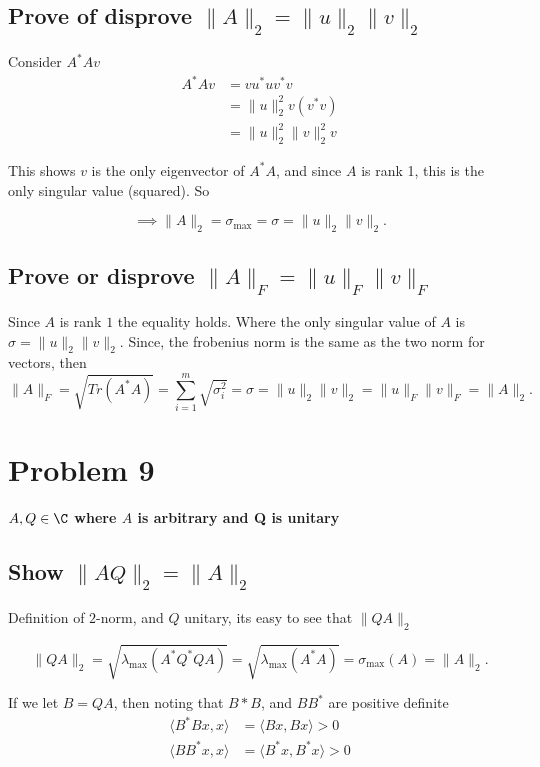 \subsection{Prove of disprove $\|A\|_{2} = \|u\|_{2}\|v\|_{2}$}%
\label{sub:prove_of_disprove_|a|__2_|u|__2_$}

Consider $A^{*}Av$ 
\begin{align*}
  A^*Av&=vu^*uv^*v \\
       &=\|u\|_2^2v(v^*v) \\
       &=\|u\|_2^2\|v\|_2^2v
\end{align*}

This shows $v$ is the only eigenvector of $A^{*}A$, and since $A$ is rank 1, this is the only singular value (squared). So

\[
\implies \|A\|_2=\sigma_{\max{}}=\sigma=\|u\|_2\|v\|_2
.\] 

\subsection{Prove or disprove $\|A\|_F=\|u\|_F\|v\|_F$}%
\label{sub:8.2}
Since $A$ is rank $1$ the equality holds. Where the only singular value of $A$ is
          $\sigma = \|u\|_2\|v\|_2$. Since, the frobenius norm is the same as the
          two norm for vectors, then
\[
  \|A\|_F = \sqrt{Tr(A^*A)} = \sum^m_{i=1}\sqrt{\sigma_i^2} = \sigma
  = \|u\|_2\|v\|_2=\|u\|_F\|v\|_F = \|A\|_2
.\] 

\section{Problem 9}%
\label{sec:problem_9}

\textbf{$A, Q\in\C$ where $A$ is arbitrary and Q is unitary} 

\subsection{Show $\|AQ\|_{2} = \|A\|_{2}$}%
\label{sub:9.1$}

Definition of $2$-norm, and $Q$ unitary, its easy to see that $\|QA\|_{2}$

\[
  \|QA\|_{2} = \sqrt{\lambda _{\text{max}} (A^{*}Q^{*}QA)} = \sqrt{\lambda
_{\text{max}} (A^{*}A)} = \sigma_{\text{max}} (A) = \|A\|_{2}
.\] 

If we let $B = QA$, then noting that  $B*B$, and $BB^{*}$ are positive definite
\begin{align*}
  \langle B^{*}Bx, x \rangle &= \langle Bx,Bx \rangle > 0 \\
  \langle BB^{*}x, x \rangle & = \langle B^{*}x, B^{*}x \rangle > 0
\end{align*}


